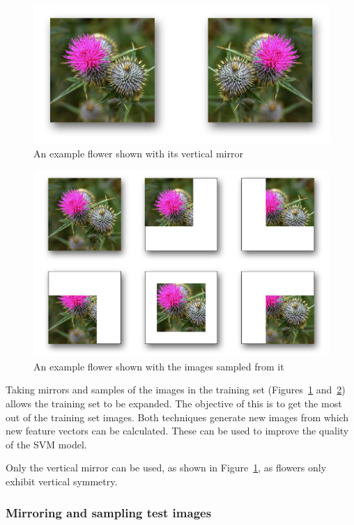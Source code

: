 \documentclass[11pt, a4paper]{report}
\begin{document}
\begin{figure}[hbt]
	\centering
  \includegraphics[totalheight=4cm]{img/09.png}
  \caption{An example flower shown with its vertical mirror}
  \label{img:09}
\end{figure}

\begin{figure}[hbt]
	\centering
  \includegraphics[totalheight=8cm]{img/10.png}
  \caption{An example flower shown with the images sampled from it}
  \label{img:10}
\end{figure}

Taking mirrors and samples of the images in the training set (Figures~\ref{img:09} and~\ref{img:10}) allows the training set to be expanded. The objective of this is to get the most out of the training set images. Both techniques generate new images from which new feature vectors can be calculated. These can be used to improve the quality of the SVM model. 

Only the vertical mirror can be used, as shown in Figure~\ref{img:09}, as flowers only exhibit vertical symmetry. 


\subsubsection{Mirroring and sampling test images}
\end{document}
